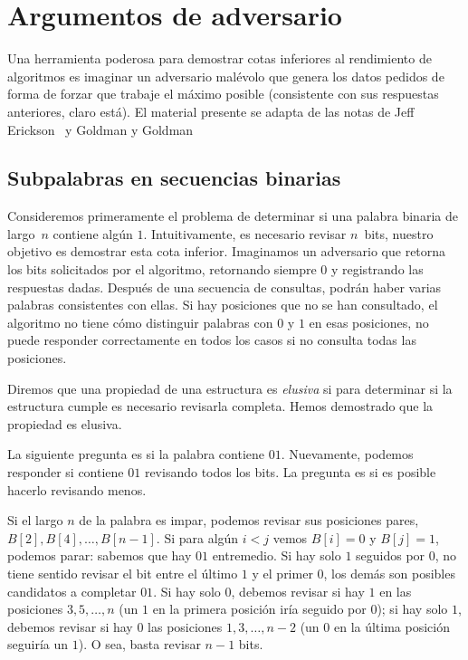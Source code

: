 

\chapter{Argumentos de adversario}
\label{cha:adversary}

  Una herramienta poderosa para demostrar cotas inferiores
  al rendimiento de algoritmos
  es imaginar un adversario malévolo que genera los datos pedidos
  de forma de forzar que trabaje el máximo posible
  (consistente con sus respuestas anteriores,
   claro está).
  El material presente se adapta de las notas de Jeff Erickson~%
    \cite{erickson18:_adversary_arguments}
  y Goldman y Goldman~%
    \cite{goldman07:_adversary_lower_bound}

\section{Subpalabras en secuencias binarias}
\label{sec:subwords}

  Consideremos primeramente el problema de determinar
  si una palabra binaria de largo~\(n\)
  contiene algún \(1\).
  Intuitivamente,
  es necesario revisar \(n\)~bits,
  nuestro objetivo es demostrar esta cota inferior.
  Imaginamos un adversario que retorna los bits solicitados por el algoritmo,
  retornando siempre \(0\) y registrando las respuestas dadas.
  Después de una secuencia de consultas,
  podrán haber varias palabras consistentes con ellas.
  Si hay posiciones que no se han consultado,
  el algoritmo no tiene cómo distinguir palabras
  con \(0\) y \(1\) en esas posiciones,
  no puede responder correctamente en todos los casos
  si no consulta todas las posiciones.

  Diremos que una propiedad de una estructura es \emph{elusiva}
  si para determinar si la estructura cumple es necesario revisarla completa.
  Hemos demostrado que la propiedad 
  es elusiva.

  La siguiente pregunta es si la palabra contiene \(01\).
  Nuevamente,
  podemos responder si contiene \(01\) revisando todos los bits.
  La pregunta es si es posible hacerlo revisando menos.

  Si el largo \(n\) de la palabra es impar,
  podemos revisar sus posiciones pares,
  \(B[2], B[4], \dotsc, B[n - 1]\).
  Si para algún \(i < j\) vemos \(B[i] = 0\) y \(B[j] = 1\),
  podemos parar:
  sabemos que hay \(01\) entremedio.
  Si hay solo \(1\) seguidos por \(0\),
  no tiene sentido revisar el bit entre el último \(1\) y el primer \(0\),
  los demás son posibles candidatos a completar \(01\).
  Si hay solo \(0\),
  debemos revisar si hay \(1\) en las posiciones \(3, 5, \dotsc, n\)
  (un \(1\) en la primera posición iría seguido por \(0\));
  si hay solo \(1\),
  debemos revisar si hay \(0\) las posiciones \(1, 3, \dotsc, n - 2\)
  (un \(0\) en la última posición seguiría un \(1\)).
  O sea,
  basta revisar \(n - 1\) bits.

